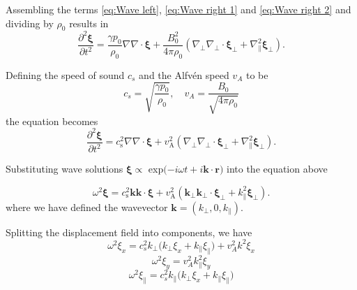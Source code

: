 Assembling the terms \eqref{eq:Wave left}, \eqref{eq:Wave right 1} and \eqref{eq:Wave right 2} and dividing by \(\rho_0\) results in 
\begin{equation*}
    \frac{\partial^{2} \boldsymbol{\xi}}{\partial t^{2}} = \frac{\gamma p_0}{\rho_0} \nabla \nabla \cdot \boldsymbol{\xi} + \frac{B_0^2}{4 \pi\rho_0} \left( \nabla_{\perp} \nabla_{\perp} \cdot \boldsymbol{\xi}_{\perp} +\nabla_{\parallel}^{2} \boldsymbol{\xi}_{\perp} \right).
\end{equation*}

Defining the speed of sound \(c_s\) and the Alfv\'en speed \(v_A\) to be 
\begin{equation*}
    c_s=\sqrt{\frac{\gamma p_0}{\rho_0}}, \quad 
    v_A=\frac{B_0}{\sqrt{4 \pi\rho_0}}
\end{equation*}
the equation becomes
\begin{equation}
    \frac{\partial^{2} \boldsymbol{\xi}}{\partial t^{2}} = c_{\mathrm{s}}^{2} \nabla \nabla \cdot \boldsymbol{\xi} + v_{\mathrm{A}}^{2} \left( \nabla_{\perp} \nabla_{\perp} \cdot \boldsymbol{\xi}_{\perp} +\nabla_{\parallel}^{2} \boldsymbol{\xi}_{\perp} \right).
    \label{eq:Wave eqn}
\end{equation}

Substituting wave solutions \(\boldsymbol{\xi} \propto\) exp\(( -i\omega t + i\boldsymbol{k}\cdot \boldsymbol{r)}\) into the equation above

\begin{equation}
     \omega ^2\boldsymbol{\xi} = c_{\mathrm{s}}^{2} \boldsymbol{k} \boldsymbol{k} \cdot \boldsymbol{\xi} + v_{\mathrm{A}}^{2} \left( \boldsymbol{k}_{\perp} \boldsymbol{k}_{\perp} \cdot \boldsymbol{\xi}_{\perp} +k_{\parallel}^{2} \boldsymbol{\xi}_{\perp} \right).
    \label{eq:Dispersion relation}
\end{equation}
where we have defined the wavevector \(\boldsymbol{k}=(k_{\perp}, 0, k_{\parallel})\).

Splitting the displacement field into components, we have
\begin{equation}
    \omega^{2}\xi_{x} = c_{s}^{2}k_{\perp}\bigl(k_{\perp}\xi_{x} + k_{\parallel}\xi_{\parallel}\bigr) + v_{A}^{2}k^{2}\xi_{x}
    \label{eq:Dispersion x}
\end{equation}
\begin{equation}
    \omega^{2}\xi_{y} = v_{A}^{2}k_{\parallel}^{2}\xi_{y}
    \label{eq:Dispersion y}
\end{equation}
\begin{equation}
    \omega^{2}\xi_{\parallel} = c_{s}^{2}k_{\parallel}\bigl(k_{\perp}\xi_{x} + k_{\parallel}\xi_{\parallel}\bigr)
    \label{eq:Dispersion z}
\end{equation}
        

